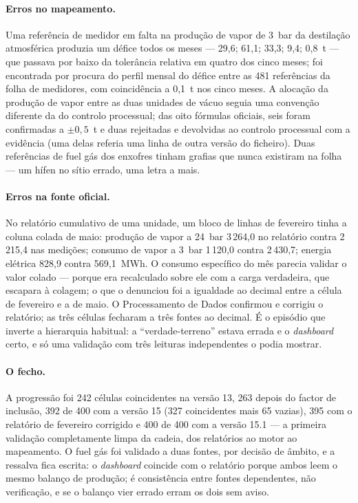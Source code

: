 \paragraph{Erros no mapeamento.} Uma referência de medidor em falta na
produção de vapor de 3~bar da destilação atmosférica produzia um défice
todos os meses --- 29,6; 61,1; 33,3; 9,4; 0,8~t --- que passava por baixo
da tolerância relativa em quatro dos cinco meses; foi encontrada por
procura do perfil mensal do défice entre as 481 referências da folha de
medidores, com coincidência a 0,1~t nos cinco meses. A alocação da
produção de vapor entre as duas unidades de vácuo seguia uma convenção
diferente da do controlo processual; das oito fórmulas oficiais, seis
foram confirmadas a $\pm0{,}5$~t e duas rejeitadas e devolvidas ao
controlo processual com a evidência (uma delas referia uma linha de
outra versão do ficheiro). Duas referências de fuel gás dos enxofres
tinham grafias que nunca existiram na folha --- um hífen no sítio errado,
uma letra a mais.

\paragraph{Erros na fonte oficial.} No relatório cumulativo de uma
unidade, um bloco de linhas de fevereiro tinha a coluna colada de maio:
produção de vapor a 24~bar 3\,264,0 no relatório contra 2\,215,4 nas
medições; consumo de vapor a 3~bar 1\,120,0 contra 2\,430,7; energia
elétrica 828,9 contra 569,1~MWh. O consumo específico do mês parecia
validar o valor colado --- porque era recalculado sobre ele com a carga
verdadeira, que escapara à colagem; o que o denunciou foi a igualdade ao
decimal entre a célula de fevereiro e a de maio. O Processamento de Dados
confirmou e corrigiu o relatório; as três células fecharam a três fontes
ao decimal. É o episódio que inverte a hierarquia habitual: a
``verdade-terreno'' estava errada e o \emph{dashboard} certo, e só uma
validação com três leituras independentes o podia mostrar.

\paragraph{O fecho.} A progressão foi 242 células coincidentes na versão
13, 263 depois do factor de inclusão, 392 de 400 com a versão 15 (327
coincidentes mais 65 vazias), 395 com o relatório de fevereiro corrigido e
400 de 400 com a versão 15.1 --- a primeira validação completamente limpa
da cadeia, dos relatórios ao motor ao mapeamento.
O fuel gás foi validado a duas fontes, por decisão de âmbito, e a
ressalva fica escrita: o \emph{dashboard} coincide com o relatório porque
ambos leem o mesmo balanço de produção; é consistência entre fontes
dependentes, não verificação, e se o balanço vier errado erram os dois
sem aviso.

